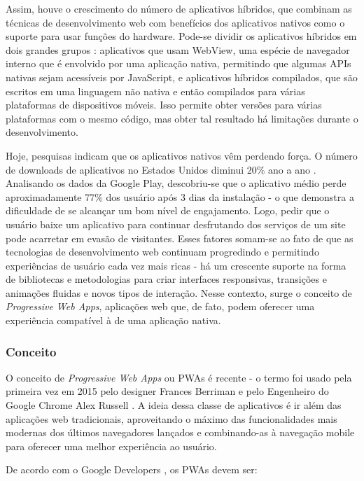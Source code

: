 Assim, houve o crescimento do número de aplicativos híbridos, que combinam as técnicas de desenvolvimento web com benefícios dos aplicativos nativos como o suporte para usar funções do hardware. Pode-se dividir os aplicativos híbridos em dois grandes grupos \cite{rudolph}: aplicativos que usam WebView, uma espécie de navegador interno que é envolvido por uma aplicação nativa, permitindo que algumas APIs nativas sejam acessíveis por JavaScript, e aplicativos híbridos compilados, que são escritos em uma linguagem não nativa e então compilados para várias plataformas de dispositivos móveis. Isso permite obter versões para várias plataformas com o mesmo código, mas obter tal resultado há limitações durante o desenvolvimento.

Hoje, pesquisas indicam que os aplicativos nativos vêm perdendo força. O número de downloads de aplicativos no Estados Unidos diminui 20\% ano a ano \cite{benson}. Analisando os dados da Google Play, descobriu-se que o aplicativo médio perde aproximadamente 77\% dos usuário após 3 dias da instalação \cite{chen} - o que demonstra a dificuldade de se alcançar um bom nível de engajamento. Logo, pedir que o usuário baixe um aplicativo para continuar desfrutando dos serviços de um site pode acarretar em evasão de visitantes. Esses fatores somam-se ao fato de que as tecnologias de desenvolvimento web continuam progredindo e permitindo experiências de usuário cada vez mais ricas - há um crescente suporte na forma de bibliotecas e metodologias para criar interfaces responsivas, transições e animações fluidas e novos tipos de interação. Nesse contexto, surge o conceito de \textit{Progressive Web Apps}, aplicações web que, de fato, podem oferecer uma experiência compatível à de uma aplicação nativa.

\subsubsection{Conceito}
O conceito de \textit{Progressive Web Apps} ou PWAs é recente - o termo foi usado pela primeira vez em 2015 pelo designer Frances Berriman e pelo Engenheiro do Google Chrome Alex Russell \cite{russell}. A ideia dessa classe de aplicativos é ir além das aplicações web tradicionais, aproveitando o máximo das funcionalidades mais modernas dos últimos navegadores lançados e combinando-as à navegação mobile para oferecer uma melhor experiência ao usuário.

De acordo com o Google Developers \cite{googledevpwa}, os PWAs devem ser:

